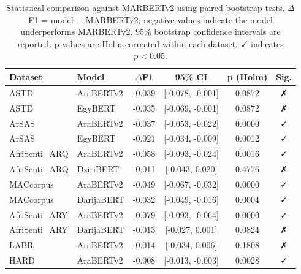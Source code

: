 \begin{table}[t]
\centering
\caption{Statistical comparison against MARBERTv2 using paired bootstrap tests. $\Delta$F1 = model $-$ MARBERTv2; negative values indicate the model underperforms MARBERTv2. 95\% bootstrap confidence intervals are reported. p-values are Holm-corrected within each dataset. $\checkmark$ indicates $p < 0.05$.}
\label{tab:significance}
\begin{tabular}{l l c c c c}
\toprule
Dataset & Model & $\Delta$F1 & 95\% CI & p (Holm) & Sig. \\
\midrule
ASTD & AraBERTv2 & -0.039 & [-0.078, -0.001] & 0.0872 & ✗ \\
ASTD & EgyBERT & -0.035 & [-0.069, -0.001] & 0.0872 & ✗ \\
ArSAS & AraBERTv2 & -0.037 & [-0.053, -0.022] & 0.0000 & ✓ \\
ArSAS & EgyBERT & -0.021 & [-0.034, -0.009] & 0.0012 & ✓ \\
AfriSenti_ARQ & AraBERTv2 & -0.058 & [-0.093, -0.024] & 0.0016 & ✓ \\
AfriSenti_ARQ & DziriBERT & -0.011 & [-0.043, 0.020] & 0.4776 & ✗ \\
MACcorpus & AraBERTv2 & -0.049 & [-0.067, -0.032] & 0.0000 & ✓ \\
MACcorpus & DarijaBERT & -0.032 & [-0.049, -0.016] & 0.0004 & ✓ \\
AfriSenti_ARY & AraBERTv2 & -0.079 & [-0.093, -0.064] & 0.0000 & ✓ \\
AfriSenti_ARY & DarijaBERT & -0.013 & [-0.027, 0.001] & 0.0824 & ✗ \\
LABR & AraBERTv2 & -0.014 & [-0.034, 0.006] & 0.1808 & ✗ \\
HARD & AraBERTv2 & -0.008 & [-0.013, -0.003] & 0.0028 & ✓ \\
\bottomrule
\end{tabular}
\end{table}
